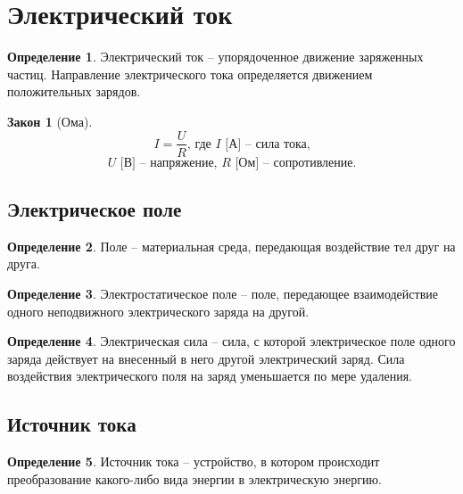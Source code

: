 \documentclass[12pt]{article}
\theoremstyle{definition}
\newtheorem{definition}{Определение}
\newtheorem{law}[theorem]{Закон}
\begin{document}
\section{Электрический ток}

\begin{definition}
    Электрический ток -- упорядоченное движение заряженных частиц. Направление электрического тока определяется движением положительных зарядов.
\end{definition}
\begin{law}[Ома]
    $$I=\frac{U}{R}\text{, где }I\text{ [А] – сила тока,}$$
$$U\text{ [В] -- напряжение, }R\text{ [Ом] – сопротивление.}$$
\end{law}

\subsection{Электрическое поле}

\begin{definition}
    Поле -- материальная среда, передающая воздействие тел друг на друга.
\end{definition}
\begin{definition}
    Электростатическое поле -- поле, передающее взаимодействие одного неподвижного электрического заряда на другой.
\end{definition}
\begin{definition}
    Электрическая сила – сила, с которой электрическое поле одного заряда действует на внесенный в него другой электрический заряд. Сила воздействия электрического поля на заряд уменьшается по мере удаления.
\end{definition}

\subsection{Источник тока}

\begin{definition}
    Источник тока -- устройство, в котором происходит преобразование какого-либо вида энергии в электрическую энергию.
\end{definition}

\begin{center}
\end{center}
\end{document}
